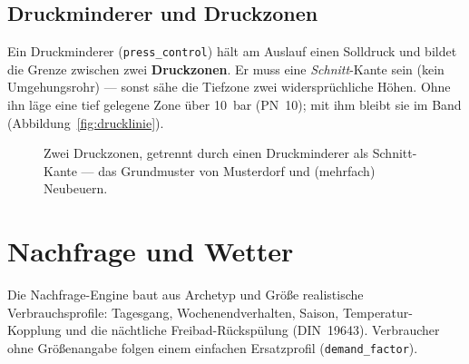 \documentclass[11pt,a4paper,parskip=half]{scrreprt}
\begin{document}
\section{Druckminderer und Druckzonen}
Ein Druckminderer (\texttt{press\_control}) hält am Auslauf einen Solldruck und
bildet die Grenze zwischen zwei \textbf{Druckzonen}. Er muss eine \emph{Schnitt}-Kante
sein (kein Umgehungsrohr) — sonst sähe die Tiefzone zwei widersprüchliche Höhen.
Ohne ihn läge eine tief gelegene Zone über 10~bar (PN~10); mit ihm bleibt sie im
Band (Abbildung~\ref{fig:drucklinie}).

\begin{figure}[t]
\centering
{}
\caption{Zwei Druckzonen, getrennt durch einen Druckminderer als Schnitt-Kante —
das Grundmuster von Musterdorf und (mehrfach) Neubeuern.}
\label{fig:druckzonen}
\end{figure}

\chapter{Nachfrage und Wetter}
\label{ch:nachfrage}

Die Nachfrage-Engine baut aus Archetyp und Größe realistische Verbrauchsprofile:
Tagesgang, Wochenendverhalten, Saison, Temperatur-Kopplung und die nächtliche
Freibad-Rückspülung (DIN~19643). Verbraucher ohne Größenangabe folgen einem
einfachen Ersatzprofil (\texttt{demand\_factor}).
\end{document}
